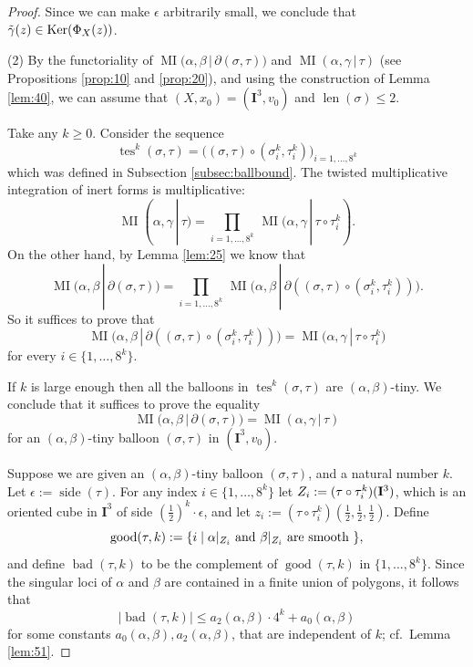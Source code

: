 \documentclass[10pt, a4paper]{amsart}
\theoremstyle{definition}
\numberwithin{equation}{section}
\newcommand{\opn}{\operatorname}
\newcommand{\mbf}[1]{\mathbf{#1}}
\newcommand{\smfrac}[2]{{\textstyle \frac{#1}{#2}}}
\newcommand{\til}[1]{\tilde{#1}}
\newcommand{\abs}[1]{\lvert #1 \rvert}
\renewcommand{\vert}{\, | \,}
\newcommand{\lb}{\linebreak}
\begin{document}
\begin{proof}
Since we can make $\epsilon$ arbitrarily small, we conclude that
$\til{\gamma}(z) \in \lb \opn{Ker}(\Phi_X(z))$. 

\medskip \noindent
(2) By the functoriality of 
$\opn{MI} \bigl( \alpha, \beta \vert \partial (\sigma, \tau)\bigr)$
and 
$\opn{MI} (\alpha, \gamma \vert \tau)$
(see Propositions \ref{prop:10} and \ref{prop:20}), and using the construction
of Lemma \ref{lem:40}, we can assume that 
$(X, x_0) = (\mbf{I}^3, v_0)$ and 
$\opn{len}(\sigma) \leq 2$. 

Take any $k \geq 0$. Consider the sequence
\[ \opn{tes}^k(\sigma, \tau) = 
\bigl( (\sigma, \tau) \circ (\sigma^{k}_i, \tau^{k}_i) 
\bigr)_{i = 1, \ldots, 8^k} \]
which was defined in Subsection \ref{subsec:ballbound}.
The twisted multiplicative integration of inert forms is multiplicative:
\[ \opn{MI} (\alpha, \gamma \vert \tau) = 
\prod_{i = 1, \ldots, 8^k} \, 
\opn{MI} \bigl( \alpha, \gamma \vert \tau \circ \tau^k_i) . \]
On the other hand, by Lemma \ref{lem:25} we know that
\[ \opn{MI} \bigl( \alpha, \beta \vert \partial (\sigma, \tau) \bigr) = 
\prod_{i = 1, \ldots, 8^k} \, 
\opn{MI} \bigl( \alpha, \beta \vert \partial
((\sigma, \tau) \circ (\sigma^{k}_i, \tau^{k}_i)) \bigr) . \]
So it suffices to prove that 
\[ \opn{MI} \bigl( \alpha, \beta \vert \partial
((\sigma, \tau) \circ (\sigma^{k}_i, \tau^{k}_i)) \bigr) =
\opn{MI} \bigl( \alpha, \gamma \vert \tau \circ \tau^k_i) \]
for every $i \in \{ 1, \ldots, 8^k \}$. 

If $k$ is large enough then all the balloons in
$\opn{tes}^k (\sigma, \tau)$
are $(\alpha, \beta)$-tiny. We conclude that it suffices to prove 
the equality
\[  \opn{MI} \bigl( \alpha, \beta \vert \partial (\sigma, \tau)
\bigr) = 
\opn{MI} (\alpha, \gamma \vert \tau)  \]
for an $(\alpha, \beta)$-tiny balloon $(\sigma, \tau)$ in $(\mbf{I}^3, v_0)$.

Suppose we are given an $(\alpha, \beta)$-tiny balloon $(\sigma, \tau)$, and a
natural number $k$. Let $\epsilon := \opn{side}(\tau)$. 
For any index $i \in \{ 1, \ldots, 8^k \}$ let
$Z_i := \lb (\tau \circ \tau^k_i)(\mbf{I}^3)$, which is an oriented cube in
$\mbf{I}^3$ of side $(\smfrac{1}{2})^k \cdot \epsilon$, and let
$z_i :=  (\tau \circ \tau^k_i)(\smfrac{1}{2}, \smfrac{1}{2}, \smfrac{1}{2})$.
Define
\[ \opn{good}(\tau, k) := \{ i \mid \alpha|_{Z_i} \textup{ and } 
\beta|_{Z_i} \textup { are smooth } \} , \]
and define $\opn{bad}(\tau, k)$ to be the complement of $\opn{good}(\tau, k)$ in
$\{ 1, \ldots, 8^k \}$.
Since the singular loci of $\alpha$ and $\beta$ are contained in a finite union
of polygons, it follows that 
\[ \abs{ \opn{bad}(\tau, k) } \leq 
a_2(\alpha, \beta) \cdot 4^k + a_0(\alpha, \beta) \]
for some constants $a_0(\alpha, \beta), a_2(\alpha, \beta)$, that are
independent of $k$; cf.\ Lemma \ref{lem:51}.


\end{proof}
\end{document}
